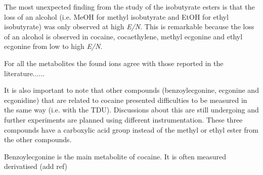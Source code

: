 The most unexpected finding from the study of the isobutyrate esters is that the loss of an alcohol (i.e. MeOH for methyl isobutyrate and EtOH for ethyl isobutyrate) was only observed at high \textit{E/N}.
%
This is remarkable because the loss of an alcohol is observed in cocaine, cocaethylene, methyl ecgonine and ethyl ecgonine from low to high \textit{E/N}. 



For all the metabolites the found ions agree with those reported in the literature......





It is also important to note that other compounds (benzoylecgonine, ecgonine and ecgonidine) that are related to cocaine presented difficulties to be measured in the same way (i.e. with the TDU). Discussions about this are still undergoing and further experiments are planned using different instrumentation.
These three compounds have a carboxylic acid group instead of the methyl or ethyl ester from the other compounds.

Benzoylecgonine is the main metabolite of cocaine. It is often measured derivatised (add ref)




















 
 
 

 
 
 
 
 
 
 
 
 








